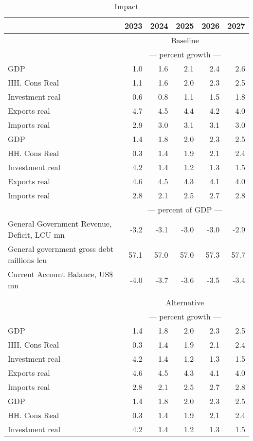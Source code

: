 \documentclass{article}
\begin{document}
\begin{table}[ht]
\caption{Impact}
\begin{tabular}{lrrrrr}
\toprule
 & 2023 & 2024 & 2025 & 2026 & 2027 \\
\midrule
&\multicolumn{5}{c}{Baseline}           \\
&\multicolumn{5}{c}{--- percent growth ---}           \\
GDP & 1.0 & 1.6 & 2.1 & 2.4 & 2.6 \\
HH. Cons Real & 1.1 & 1.6 & 2.0 & 2.3 & 2.5 \\
Investment real & 0.6 & 0.8 & 1.1 & 1.5 & 1.8 \\
Exports real & 4.7 & 4.5 & 4.4 & 4.2 & 4.0 \\
Imports real & 2.9 & 3.0 & 3.1 & 3.1 & 3.0 \\
GDP & 1.4 & 1.8 & 2.0 & 2.3 & 2.5 \\
HH. Cons Real & 0.3 & 1.4 & 1.9 & 2.1 & 2.4 \\
Investment real & 4.2 & 1.4 & 1.2 & 1.3 & 1.5 \\
Exports real & 4.6 & 4.5 & 4.3 & 4.1 & 4.0 \\
Imports real & 2.8 & 2.1 & 2.5 & 2.7 & 2.8 \\
&\multicolumn{5}{c}{--- percent of GDP ---}           \\
General Government Revenue, Deficit, LCU mn & -3.2 & -3.1 & -3.0 & -3.0 & -2.9 \\
General government gross debt millions lcu & 57.1 & 57.0 & 57.0 & 57.3 & 57.7 \\
Current Account Balance, US\$ mn & -4.0 & -3.7 & -3.6 & -3.5 & -3.4 \\
&\multicolumn{5}{c}{  }           \\
&\multicolumn{5}{c}{Alternative}           \\
&\multicolumn{5}{c}{--- percent growth ---}           \\
GDP & 1.4 & 1.8 & 2.0 & 2.3 & 2.5 \\
HH. Cons Real & 0.3 & 1.4 & 1.9 & 2.1 & 2.4 \\
Investment real & 4.2 & 1.4 & 1.2 & 1.3 & 1.5 \\
Exports real & 4.6 & 4.5 & 4.3 & 4.1 & 4.0 \\
Imports real & 2.8 & 2.1 & 2.5 & 2.7 & 2.8 \\
GDP & 1.4 & 1.8 & 2.0 & 2.3 & 2.5 \\
HH. Cons Real & 0.3 & 1.4 & 1.9 & 2.1 & 2.4 \\
Investment real & 4.2 & 1.4 & 1.2 & 1.3 & 1.5 \\

\end{tabular}
\end{table}
\end{document}
